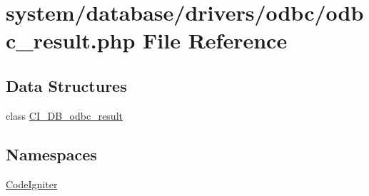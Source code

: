 \hypertarget{odbc__result_8php}{\section{system/database/drivers/odbc/odbc\-\_\-result.php File Reference}
\label{odbc__result_8php}
}
\subsection*{Data Structures}
\begin{DoxyCompactItemize}
\item 
class \hyperlink{class_c_i___d_b__odbc__result}{C\-I\-\_\-\-D\-B\-\_\-odbc\-\_\-result}
\end{DoxyCompactItemize}
\subsection*{Namespaces}
\begin{DoxyCompactItemize}
\item 
\hyperlink{namespace_code_igniter}{Code\-Igniter}
\end{DoxyCompactItemize}
